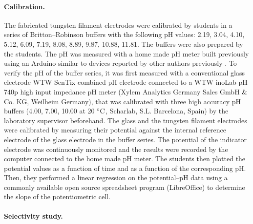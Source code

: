 \documentclass[manuscript=article, journal=jceda8]{achemso}
\begin{document}
\paragraph{Calibration.}

The fabricated tungsten filament electrodes were calibrated by students in a series of Britton--Robinson buffers with the following pH values: 2.19, 3.04, 4.10, 5.12, 6.09, 7.19, 8.08, 8.89, 9.87, 10.88, 11.81. The buffers were also prepared by the students. The pH was measured with a home made pH meter built previously using an Arduino similar to devices reported by other authors previously \cite{jin2018open}. 
To verify the pH of the buffer series, it was first measured with a conventional glass electrode WTW SenTix combined pH electrode connected to a WTW inoLab pH 740p high input impedance pH meter (Xylem Analytics Germany Sales GmbH \& Co. KG, Weilheim Germany), that was calibrated with three high accuracy pH buffers (4.00, 7.00, 10.00 at 20 $\celsius$, Scharlab, S.L. Barcelona, Spain) by the laboratory supervisor beforehand.
The glass and the tungsten filament electrodes were calibrated by measuring their potential against the internal reference electrode of the glass electrode in the buffer series. The potential of the indicator electrode was continuously monitored and the results were recorded by the computer connected to the home made pH meter.
The students then plotted the potential values as a function of time and as a function of the corresponding pH. Then, they performed a linear regression on the potential--pH data using a commonly available open source spreadsheet program (LibreOffice) to determine the slope of the potentiometric cell. 


\paragraph{Selectivity study.}
\end{document}

